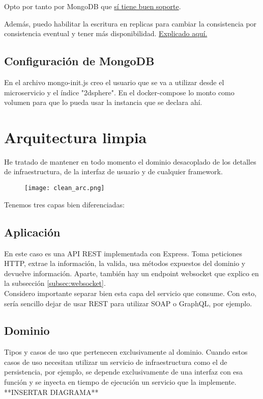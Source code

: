 Opto por tanto por MongoDB que \href{https://stackoverflow.com/questions/25734092/query-locations-within-a-radius-in-mongodb}{sí tiene buen soporte}.

Además, puedo habilitar la escritura en replicas para cambiar la consistencia por consistencia eventual y tener más disponibilidad. \href{https://stackoverflow.com/questions/11292215/where-does-mongodb-stand-in-the-cap-theorem}{Explicado aquí.}

\subsection{Configuración de MongoDB}

En el archivo mongo-init.js creo el usuario que se va a utilizar desde el microservicio y el índice "2dsphere". 
En el docker-compose lo monto como volumen para que lo pueda usar la instancia que se declara ahí.

\section{Arquitectura limpia}\label{sec:clean}

He tratado de mantener en todo momento el dominio desacoplado de los detalles de infraestructura, de la interfaz de usuario y de cualquier framework.
\begin{figure}[H]
	\centering	
	\texttt{[image: clean\_arc.png]}
	\end{figure}

Tenemos tres capas bien diferenciadas:
\subsection{Aplicación}
En este caso es una API REST implementada con Express. Toma peticiones HTTP, extrae la información, la valida, usa métodos expuestos del dominio y devuelve información.
Aparte, también hay un endpoint websocket que explico en la subsección \ref{subsec:websocket}. \\
Considero importante separar bien esta capa del servicio que consume. Con esto, sería sencillo dejar de usar 
REST para utilizar SOAP o GraphQL, por ejemplo.
\subsection{Dominio}
Tipos y casos de uso que pertenecen exclusivamente al dominio.
Cuando estos casos de uso necesitan utilizar un servicio de infraestructura como el de persistencia, por ejemplo,
se depende exclusivamente de una interfaz con esa función y se inyecta en tiempo de ejecución un servicio que la implemente.
**INSERTAR DIAGRAMA** \\

